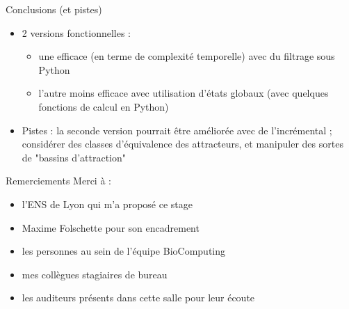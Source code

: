 \documentclass{beamer}
\begin{document}
\begin{frame}{Conclusions (et pistes)}
	\begin{itemize}
		\pause
		\item 2 versions fonctionnelles :
		\begin{itemize}
			\item une efficace (en terme de complexité temporelle) avec du filtrage sous Python
			\item l'autre moins efficace avec utilisation d'états globaux (avec quelques fonctions de calcul en Python)
		\end{itemize}
		\pause
		\item Pistes : la seconde version pourrait être améliorée avec de l'incrémental ; considérer des classes d'équivalence des attracteurs, et manipuler des sortes de "bassins d'attraction"
	\end{itemize}
\end{frame}

\begin{frame}{Remerciements}
	Merci à :
	\begin{itemize}
		\item l'ENS de Lyon qui m'a proposé ce stage
		\item Maxime Folschette pour son encadrement
		\item les personnes au sein de l'équipe BioComputing
		\item mes collègues stagiaires de bureau
		\item les auditeurs présents dans cette salle pour leur écoute
	\end{itemize}
\end{frame}
\end{document}
